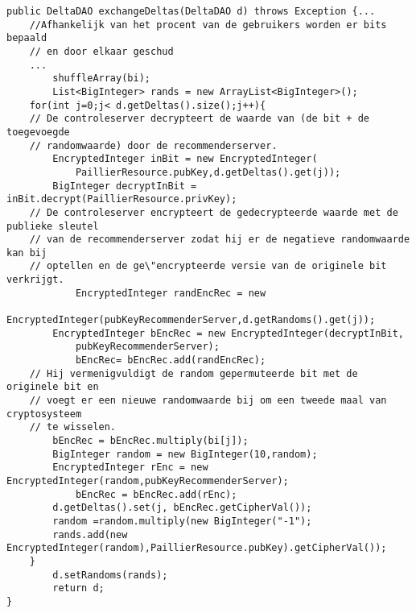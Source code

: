 \begin{verbatim}
public DeltaDAO exchangeDeltas(DeltaDAO d) throws Exception {...
    //Afhankelijk van het procent van de gebruikers worden er bits bepaald 
    // en door elkaar geschud
	...
    	shuffleArray(bi);
    	List<BigInteger> rands = new ArrayList<BigInteger>();
    for(int j=0;j< d.getDeltas().size();j++){
    // De controleserver decrypteert de waarde van (de bit + de toegevoegde 
    // randomwaarde) door de recommenderserver.
       	EncryptedInteger inBit = new EncryptedInteger(
       		PaillierResource.pubKey,d.getDeltas().get(j));
       	BigInteger decryptInBit =  inBit.decrypt(PaillierResource.privKey);
    // De controleserver encrypteert de gedecrypteerde waarde met de publieke sleutel
    // van de recommenderserver zodat hij er de negatieve randomwaarde kan bij 
    // optellen en de ge\"encrypteerde versie van de originele bit verkrijgt.
    		EncryptedInteger randEncRec = new 
        		EncryptedInteger(pubKeyRecommenderServer,d.getRandoms().get(j));
      	EncryptedInteger bEncRec = new EncryptedInteger(decryptInBit,
      		pubKeyRecommenderServer);
        	bEncRec= bEncRec.add(randEncRec);
    // Hij vermenigvuldigt de random gepermuteerde bit met de originele bit en 
    // voegt er een nieuwe randomwaarde bij om een tweede maal van cryptosysteem 
    // te wisselen.
       	bEncRec = bEncRec.multiply(bi[j]);
        BigInteger random = new BigInteger(10,random);
       	EncryptedInteger rEnc = new EncryptedInteger(random,pubKeyRecommenderServer);
        	bEncRec = bEncRec.add(rEnc);
       	d.getDeltas().set(j, bEncRec.getCipherVal());
       	random =random.multiply(new BigInteger("-1");
       	rands.add(new EncryptedInteger(random),PaillierResource.pubKey).getCipherVal());        
   	}
    	d.setRandoms(rands);
    	return d;        
}
\end{verbatim}
